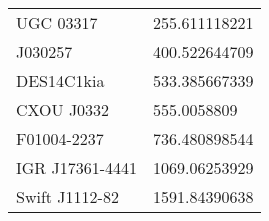 \documentclass[]{article}
\begin{document}
\begin{tabular}{ |p{5cm}||p{5cm}|}
UGC 03317 & \num[round-precision=2, round-mode=figures, scientific-notation=true]{255.611118221}  \\ 
J030257 & \num[round-precision=2, round-mode=figures, scientific-notation=true]{400.522644709}  \\ 
DES14C1kia & \num[round-precision=2, round-mode=figures, scientific-notation=true]{533.385667339}  \\ 
CXOU J0332 & \num[round-precision=2, round-mode=figures, scientific-notation=true]{555.0058809}  \\ 
F01004-2237 & \num[round-precision=2, round-mode=figures, scientific-notation=true]{736.480898544}  \\ 
IGR J17361-4441 & \num[round-precision=2, round-mode=figures, scientific-notation=true]{1069.06253929}  \\ 
Swift J1112-82 & \num[round-precision=2, round-mode=figures, scientific-notation=true]{1591.84390638}  \\ 
\hline 
\end{tabular} 
\end{document}
